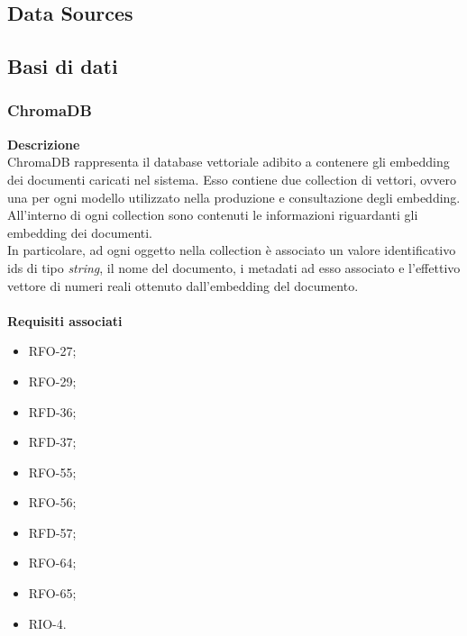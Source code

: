 \subsection{Data Sources} \label{subsec:datasources}

\subsection{Basi di dati} \label{subsec:basididati}
\subsubsection{ChromaDB}
\textbf{Descrizione}\\
ChromaDB rappresenta il database vettoriale adibito a contenere gli embedding dei documenti caricati nel sistema. Esso contiene due collection di vettori, ovvero una per ogni modello utilizzato nella produzione e consultazione degli embedding.\\
All'interno di ogni collection sono contenuti le informazioni riguardanti gli embedding dei documenti.\\
In particolare, ad ogni oggetto nella collection è associato un valore identificativo ids di tipo \textit{string}, il nome del documento, i metadati ad esso associato e l'effettivo vettore di numeri reali ottenuto dall'embedding del documento.\\ \\
\textbf{Requisiti associati}
\begin{itemize}[itemsep=-4pt]
    \item RFO-27;
    \item RFO-29;
    \item RFD-36;
    \item RFD-37;
    \item RFO-55;
    \item RFO-56;
    \item RFD-57;
    \item RFO-64;
    \item RFO-65;
    \item RIO-4.
\end{itemize}


